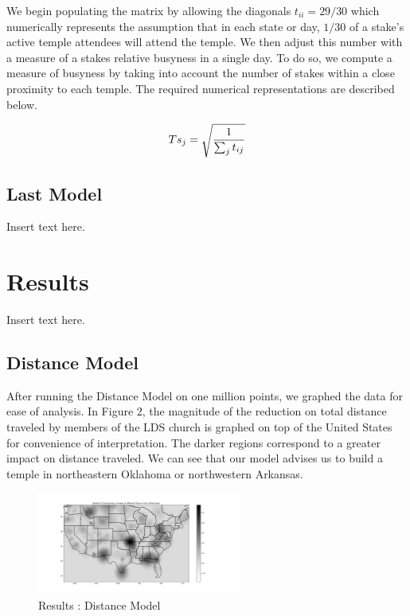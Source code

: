 \documentclass[twoside,twocolumn]{article}
\begin{document}
We begin populating the matrix by allowing the diagonals $t_{ii} = 29/30$ which numerically represents the assumption that in each state or day, $1/30$ of a stake's active temple attendees will attend the temple.
We then adjust this number with a measure of a stakes relative busyness in a single day.
To do so, we compute a measure of busyness by taking into account the number of stakes within a close proximity to each temple.
The required numerical representations are described below.

\begin{equation}
\begin{aligned}
Ts_j = \sqrt{1\over{\sum_j{t_{ij}}}}
\end{aligned}
\end{equation}


\subsection{Last Model} %
Insert text here.

\section{Results}
\label{sec:res}
Insert text here.

\subsection{Distance Model}
After running the Distance Model on one million points, we graphed the data for ease of analysis.
In Figure 2, the magnitude of the reduction on total distance traveled by members of the LDS church is graphed on top of the United States for convenience of interpretation.
The darker regions correspond to a greater impact on distance traveled.
We can see that our model advises us to build a temple in northeastern Oklahoma or northwestern Arkansas.

\begin{figure}[h!] %
\centering %
\includegraphics[width=0.6\textwidth]{Euclidean_Graph1} %
\caption{Results : Distance Model} %
\label{fig:Results1}
\end{figure}
\end{document}
